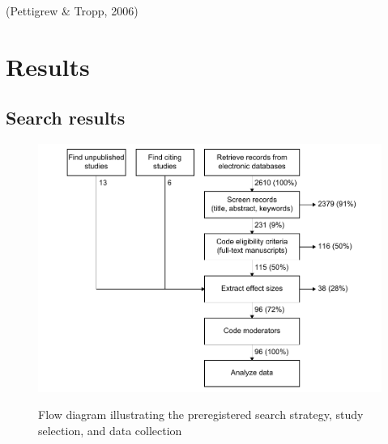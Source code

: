 \documentclass[twocolumn, 10pt, letterpaper]{article}
\begin{document}
(Pettigrew \& Tropp, 2006)

\hypertarget{results}{%
\section{Results}\label{results}}

\hypertarget{search-results}{%
\subsection{Search results}\label{search-results}}

\begin{figure}[!t]
\centering
\caption{Flow diagram illustrating the preregistered search strategy, study selection, and data collection}
\includegraphics[scale=1]{../figures/figure-1}
\label{fig:f1}
\end{figure}
\end{document}
